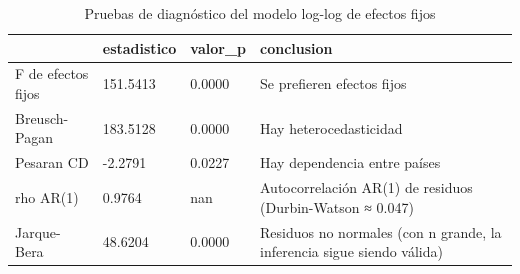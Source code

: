 \begin{table}[htbp]
\centering
\caption{Pruebas de diagnóstico del modelo log-log de efectos fijos}
\begin{tabular}{llll}
\hline
 & estadistico & valor\_p & conclusion \\
\hline
F de efectos fijos & 151.5413 & 0.0000 & Se prefieren efectos fijos \\
Breusch-Pagan & 183.5128 & 0.0000 & Hay heterocedasticidad \\
Pesaran CD & -2.2791 & 0.0227 & Hay dependencia entre países \\
rho AR(1) & 0.9764 & nan & Autocorrelación AR(1) de residuos (Durbin-Watson ≈ 0.047) \\
Jarque-Bera & 48.6204 & 0.0000 & Residuos no normales (con n grande, la inferencia sigue siendo válida) \\
\hline
\end{tabular}
\label{tab:tabla6_pruebas}
\end{table}